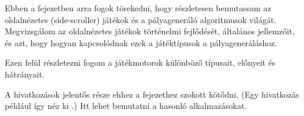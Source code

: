 

Ebben a fejezetben arra fogok törekedni, hogy részletesen bemutassam az oldalnézetes (side-scroller) játékok és a pályageneráló algoritmusok világát. Megvizsgálom az oldalnézetes játékok történelmi fejlődését, általános jellemzőit, és azt, hogy hogyan kapcsolódnak ezek a játéktípusok a pályageneráláshoz.

Ezen felül részletezni fogom a játékmotorok különböző típusait, előnyeit és hátrányait.

A hivatkozások jelentős része ehhez a fejezethez szokott kötődni.
(Egy hivatkozás például így néz ki \cite{redbull}.)
Itt lehet bemutatni a hasonló alkalmazásokat.


